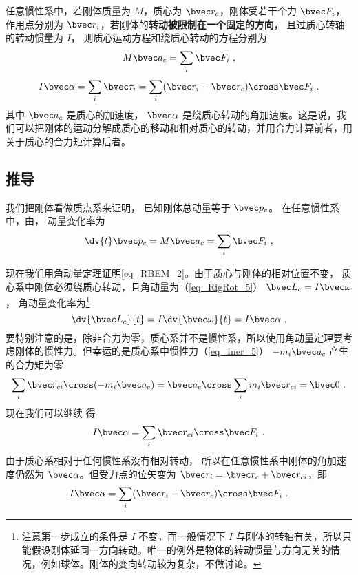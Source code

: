

任意惯性系中，若刚体质量为 $M$，质心为 $\bvec r_c$，刚体受若干个力 $\bvec F_i$，作用点分别为 $\bvec r_i$，若刚体的\textbf{转动被限制在一个固定的方向}， 且过质心转轴的转动惯量为 $I$， 则质心运动方程和绕质心转动的方程分别为
\begin{equation}\label{eq_RBEM_1}
M\bvec a_c = \sum_i \bvec F_i~,
\end{equation}
\begin{equation}\label{eq_RBEM_2}
I \bvec \alpha = \sum_i \bvec \tau_i = \sum_i (\bvec r_i-\bvec r_c) \cross  \bvec F_i~.
\end{equation}
其中 $\bvec a_c$ 是质心的加速度， $\bvec \alpha$ 是绕质心转动的角加速度。这是说，我们可以把刚体的运动分解成质心的移动和相对质心的转动，并用合力计算前者，用关于质心的合力矩计算后者。

\subsection{推导}
我们把刚体看做质点系来证明， 已知刚体总动量等于 $\bvec p_c$。 在任意惯性系中，由， 动量变化率为
\begin{equation}
\dv{t} \bvec p_c = M \bvec a_c = \sum_i \bvec F_i~,
\end{equation}

现在我们用角动量定理证明\autoref{eq_RBEM_2}。由于质心与刚体的相对位置不变，%
质心系中刚体必须绕质心转动，且角动量为（\autoref{eq_RigRot_5}） $\bvec L_c = I \bvec\omega$， 角动量变化率为\footnote{注意第一步成立的条件是 $I$ 不变，而一般情况下 $I$ 与刚体的转轴有关，所以只能假设刚体延同一方向转动。唯一的例外是物体的转动惯量与方向无关的情况，例如球体。刚体的变向转动较为复杂，不做讨论。}
\begin{equation}
\dv{\bvec L_c}{t} = I \dv{\bvec \omega}{t} = I \bvec\alpha~.
\end{equation}
要特别注意的是，除非合力为零，质心系并不是惯性系，所以使用角动量定理要考虑刚体的惯性力。但幸运的是质心系中惯性力（\autoref{eq_Iner_5}） $-m_i \bvec a_c$ 产生的合力矩为零
\begin{equation}
\sum_i \bvec r_{ci}\cross (-m_i \bvec a_{c}) = \bvec a_{c} \cross \sum_i m_i \bvec r_{ci} = \bvec 0~.
\end{equation}
现在我们可以继续 得
\begin{equation}
I \bvec\alpha = \sum_i \bvec r_{ci} \cross  \bvec F_i~.
\end{equation}
由于质心系相对于任何惯性系没有相对转动， 所以在任意惯性系中刚体的角加速度仍然为 $\bvec\alpha$。但受力点的位矢变为 $\bvec r_i = \bvec r_c + \bvec r_{ci}$，即
\begin{equation}\label{eq_RBEM_7}
I \bvec \alpha = \sum_i (\bvec r_i-\bvec r_c) \cross  \bvec F_i~.
\end{equation}

